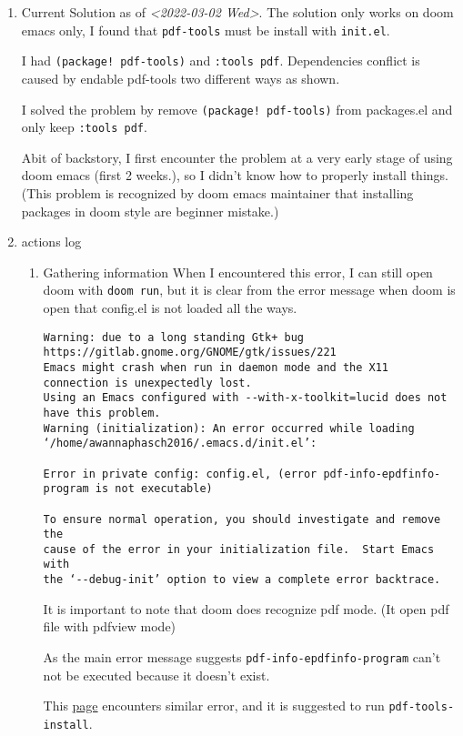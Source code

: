 \documentclass[11pt]{article}
\begin{document}
\begin{enumerate}
\item Current Solution as of \textit{<2022-03-02 Wed>}.
\label{sec:org1b9e6ad}
The solution only works on doom emacs only, I found that \texttt{pdf-tools} must be install with \texttt{init.el}.

I had \texttt{(package! pdf-tools)} and \texttt{:tools pdf}. Dependencies conflict is caused by endable pdf-tools two different ways as shown.

I solved the problem by remove \texttt{(package! pdf-tools)} from packages.el and only keep \texttt{:tools pdf}.

Abit of backstory, I first encounter the problem at a very early stage of using doom emacs (first 2 weeks.), so I didn't know how to properly install things. (This problem is recognized by doom emacs maintainer that installing packages in doom style are beginner mistake.)
\item actions log
\label{sec:orgc948fda}
\begin{enumerate}
\item Gathering information
\label{sec:orga657536}
When I encountered this error, I can still open doom with \texttt{doom run}, but it is clear from the error message when doom is open that config.el is not loaded all the ways.
\begin{verbatim}
Warning: due to a long standing Gtk+ bug
https://gitlab.gnome.org/GNOME/gtk/issues/221
Emacs might crash when run in daemon mode and the X11 connection is unexpectedly lost.
Using an Emacs configured with --with-x-toolkit=lucid does not have this problem.
Warning (initialization): An error occurred while loading ‘/home/awannaphasch2016/.emacs.d/init.el’:

Error in private config: config.el, (error pdf-info-epdfinfo-program is not executable)

To ensure normal operation, you should investigate and remove the
cause of the error in your initialization file.  Start Emacs with
the ‘--debug-init’ option to view a complete error backtrace.
\end{verbatim}

It is important to note that doom does recognize pdf mode. (It open pdf file with pdfview mode)

As the main error message suggests \texttt{pdf-info-epdfinfo-program} can't not be executed because it doesn't exist.

This \href{https://www.reddit.com/r/emacs/comments/aa9yz3/compiling\_pdftools/}{page} encounters similar error, and it is suggested to run \texttt{pdf-tools-install}.


\end{enumerate}
\end{enumerate}
\end{document}

